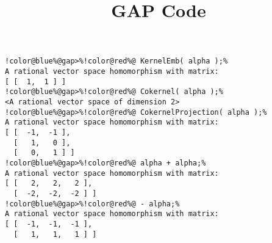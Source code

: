 \documentclass[12pt]{amsart}
\title{GAP Code}
\author{}
\begin{document}
\maketitle

\begin{Verbatim}[commandchars=!@\%,frame=single]
!color@blue%@gap>%!color@red%@ KernelEmb( alpha );%
A rational vector space homomorphism with matrix:
[ [  1,  1 ] ]
!color@blue%@gap>%!color@red%@ Cokernel( alpha );%
<A rational vector space of dimension 2>
!color@blue%@gap>%!color@red%@ CokernelProjection( alpha );%
A rational vector space homomorphism with matrix: 
[ [  -1,  -1 ],
  [   1,   0 ],
  [   0,   1 ] ]
!color@blue%@gap>%!color@red%@ alpha + alpha;%
A rational vector space homomorphism with matrix: 
[ [   2,   2,   2 ],
  [  -2,  -2,  -2 ] ]
!color@blue%@gap>%!color@red%@ - alpha;%
A rational vector space homomorphism with matrix: 
[ [  -1,  -1,  -1 ],
  [   1,   1,   1 ] ]
\end{Verbatim}
\end{document}
